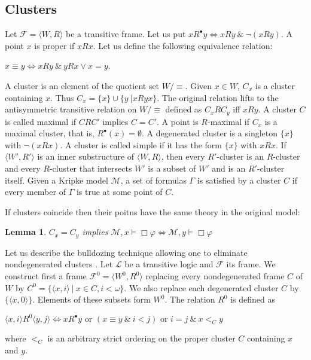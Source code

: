 \documentclass[a4paper]{article}
\theoremstyle{defin}
\theoremstyle{theorem}
\theoremstyle{prop}
\theoremstyle{lemma}
\newtheorem{lemma}{Lemma}
\theoremstyle{ex}
\theoremstyle{col}
\begin{document}
\subsection{Clusters}

Let $\mathcal{F} = \langle W, R \rangle$ be a transitive frame.
Let us put $x R^{\bullet} y \Leftrightarrow x R y \: \& \: \neg (x R y)$. A point $x$ is proper if $x R x$. Let us define the following
equivalence relation:

\begin{center}
  $x \equiv y \Leftrightarrow x R y \: \& \: y R x \lor x = y$.
\end{center}
A cluster is an element of the quotient set $W / \equiv$. Given $x \in W$, $C_x$ is a cluster containing $x$. Thus $C_x =
\{ x\} \cup \{ y \: | x R y x \}$. The original relation lifts to the antisymmetric transitive relation on $W / \equiv$ defined as
$C_x R C_y$ iff $x R y$. A cluster $C$ is called maximal if $C R C'$ implies $C = C'$. A point is $R$-maximal if $C_x$ is a maximal cluster,
that is, $R^{\bullet}(x) = \emptyset$. A degenerated cluster is a singleton $\{ x \}$ with $\neg (x R x)$. A cluster is called simple if it has the form $\{ x \}$ with $x R x$. If $\langle W', R' \rangle$ is an inner substructure of $\langle W, R \rangle$, then every $R'$-cluster is an $R$-cluster and every $R$-cluster that intersects $W'$ is a subset of $W'$ and is an $R'$-cluster itself. Given a Kripke model $\mathcal{M}$, a set of formulas $\Gamma$ is satisfied by a cluster $C$ if every member of $\Gamma$ is true at some point of $C$.

If clusters coincide then their poitns have the same theory in the original model:

\begin{lemma}
  $C_x = C_y$ implies $\mathcal{M}, x \models \Box \varphi \Leftrightarrow \mathcal{M}, y \models \Box \varphi$
\end{lemma}

Let us describe the bulldozing technique allowing one to eliminate nondegenerated clusters \cite{bull1984basic}. Let $\mathcal{L}$ be a transitive logic and $\mathcal{F}$ its frame. We construct first a frame $\mathcal{F}^0 = \langle W^{0}, R^{0} \rangle$ replacing every nondegenerated frame $C$ of $W$ by $C^0 = \{ \langle x, i \rangle \: | \: x \in C, i < \omega \}$. We also replace each degenerated cluster $C$ by $\{ \langle x,0 \rangle\}$.
Elements of these subsets form $W^0$. The relation $R^{0}$ is defined as
\begin{center}
  $\langle x, i \rangle R^{0} \langle y, j \rangle \Leftrightarrow x R^{\bullet} y \text{ or } (x \equiv y \: \& \: i < j) \text{ or } i = j \: \& \: x <_C y$
\end{center}
where $<_C$ is an arbitrary strict ordering on the proper cluster $C$ containing $x$ and $y$.
\end{document}
